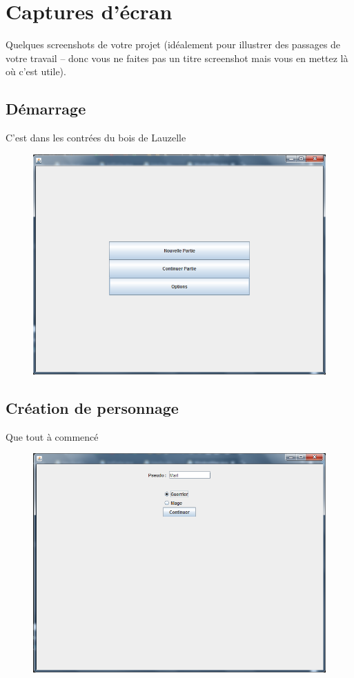 \documentclass[a4paper,titlepage]{article}
\begin{document}
	\section{Captures d'écran}
	Quelques screenshots de votre projet (idéalement pour illustrer des passages de votre travail – donc vous ne faites pas un titre screenshot mais vous en mettez là où c’est utile).
	\subsection{Démarrage}
	C'est dans les contrées du bois de Lauzelle
	\begin{figure}[h!]
		\includegraphics[scale=0.7]{EcranDemarrage.png}
	\end{figure}
	
	\subsection{Création de personnage}
	Que tout à commencé	
	\begin{figure}[h!]
		\includegraphics[scale=0.7]{EcranCreationPersonnage.png}
	\end{figure}
	
\end{document}

